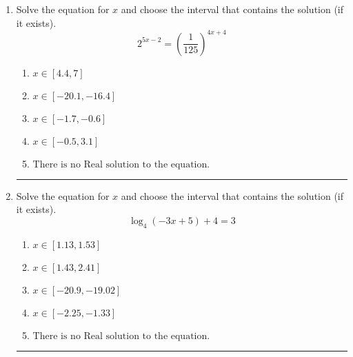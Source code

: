 \documentclass[14pt]{extbook}
\newcommand{\litem}[1]{\item#1\hspace*{-1cm}\rule{\textwidth}{0.4pt}}
\begin{document}
\begin{enumerate}
{\begin{enumerate}[label=\Alph*.]
\end{enumerate} }
\litem{
Solve the equation for $x$ and choose the interval that contains the solution (if it exists).\[ 2^{5x-2} = \left(\frac{1}{125}\right)^{4x+4} \]\begin{enumerate}[label=\Alph*.]
\item \( x \in [4.4, 7] \)
\item \( x \in [-20.1, -16.4] \)
\item \( x \in [-1.7, -0.6] \)
\item \( x \in [-0.5, 3.1] \)
\item \( \text{There is no Real solution to the equation.} \)

\end{enumerate} }
\litem{
Solve the equation for $x$ and choose the interval that contains the solution (if it exists).\[ \log_{4}{(-3x+5)}+4 = 3 \]\begin{enumerate}[label=\Alph*.]
\item \( x \in [1.13, 1.53] \)
\item \( x \in [1.43, 2.41] \)
\item \( x \in [-20.9, -19.02] \)
\item \( x \in [-2.25, -1.33] \)
\item \( \text{There is no Real solution to the equation.} \)

\end{enumerate} }
\end{enumerate}
\end{document}
